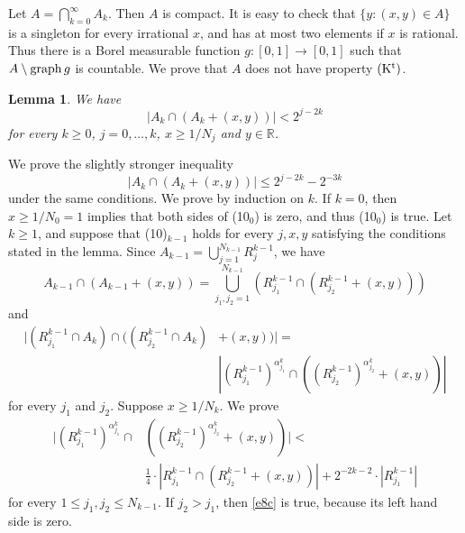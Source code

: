 \documentclass[12pt]{article}
\newtheorem{lemma}[theorem]{Lemma}
\def\rr{{\mathbb R}}
\def\se{\setminus}
\def\al{\alpha}
\def\cd{\cdot}
\def\stb{,\ldots ,}
\def\nl{[0,1]}
\def\proof{\noindent {\bf Proof.} }
\def\graph{{\rm graph}\, }
\begin{document}
Let $A=\bigcap_{k=0}^\infty A_k$. Then $A$ is compact. It is easy to check
that $\{ y\colon (x,y)\in A\}$ is a singleton for every irrational $x$,
and has at most two elements if $x$ is rational. Thus there is a Borel
measurable function $g\colon \nl \to \nl$ such that $A \se \graph g$ is
countable. We prove that $A$ does not have property ${\rm (K^t)}$. 
\begin{lemma} \label{l8}
We have 
\begin{equation*} 
\left| A_k \cap \left( A_k + (x,y) \right) \right| < 2^{j-2k}
\end{equation*}   
for every $k\ge 0$, $j=0\stb k$, $x\ge 1/N_j$ and $y\in \rr$.
\end{lemma}
\proof We prove the slightly stronger inequality
\begin{equation} \label{e8}
  \left| A_k \cap \left( A_k + (x,y) \right) \right| \le 2^{j-2k} -2^{-3k}
  \tag{10$_k$}
\end{equation}   
under the same conditions. We prove by induction on $k$.
If $k=0$, then $x\ge 1/N_0 =1$ implies that both sides of (10$_0$) is zero,
and thus (10$_0$) is true. Let $k\ge 1$, and suppose that
(10)$_{k-1}$ holds for every $j,x,y$ satisfying
the conditions stated in the lemma. Since $A_{k-1}=\bigcup_{j=1}^{N_{k-1}} R_j^{k-1}$,
we have
$$A_{k-1} \cap \left( A_{k-1} + (x,y) \right) =\bigcup_{j_1 , j_2 =1}^{N_{k-1}} \left( R_{j_1}^{k-1}
\cap (R_{j_2}^{k-1} +(x,y)) \right)$$
and
\begin{equation} \label{e8b}
\begin{split}
\big| (R_{j_1}^{k-1} \cap A_k ) \cap \big( (R_{j_2}^{k-1} \cap A_k ) &+
(x,y) \big) \big| =\\
&\left| \left( R_{j_1}^{k-1} \right) ^{\al ^k_{j_1}} \cap \left( \left(
R_{j_2}^{k-1}   \right) ^{\al ^k_{j_2}}  + (x,y) \right) \right|
\end{split}
 \tag{11}
\end{equation}
for every $j_1$ and $j_2$. Suppose $x\ge 1/N_k$. We prove
\begin{equation} \label{e8c}
\begin{split}
\bigg| \left( R_{j_1}^{k-1} \right) ^{\al ^k_{j_1}} \cap & \left( \left(
R_{j_2}^{k-1}   \right) ^{\al^k_{j_2}} + (x,y) \right) \bigg| <\\
&\tfrac{1}{4} \cd \left| R_{j_1}^{k-1} \cap (R_{j_2}^{k-1} +
(x,y) )\right| +2^{-2k-2} \cd |R^{k-1}_{j_1} |
\end{split}
\tag{12}
\end{equation}
for every $1\le j_1 , j_2 \le N_{k-1}$. If $j_2 >j_1$, then \eqref{e8c} is true,
because its left hand side is zero.
\end{document}
